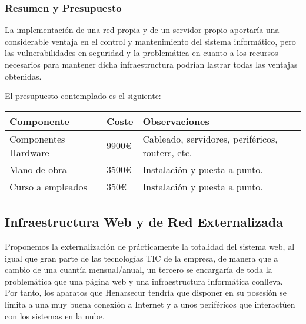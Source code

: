 \documentclass[12pt,letterpaper]{article}
\begin{document}
	\subsubsection{Resumen y Presupuesto}
	La implementación de una red propia y de un servidor propio aportaría una considerable ventaja en el control y mantenimiento del sistema informático, pero las vulnerabilidades en seguridad y la problemática en cuanto a los recursos necesarios para mantener dicha infraestructura podrían lastrar todas las ventajas obtenidas.\par
	El presupuesto contemplado es el siguiente:
	\begin{center}
    \begin{tabular}{ | l | l | p{7cm} |}
    \hline
    Componente & Coste & Observaciones \\ \hline
    Componentes Hardware & 9900€& Cableado, servidores, periféricos, routers, etc. \\ \hline
    Mano de obra & 3500€ & Instalación y puesta a punto. \\ \hline
    Curso a empleados & 350€ & Instalación y puesta a punto. \\ \hline
    \end{tabular}
	\end{center}
	
	\newpage
	
	
	\subsection{Infraestructura Web y de Red Externalizada}
	Proponemos la externalización de prácticamente la totalidad del sistema web, al igual que gran parte de las tecnologías TIC de la empresa, de manera que a cambio de una cuantía mensual/anual, un tercero se encargaría de toda la problemática que una página web y una infraestructura informática conlleva.\\
	Por tanto, los aparatos que Henarsecur tendría que disponer en su posesión se limita a una muy buena conexión a Internet y a unos periféricos que interactúen con los sistemas en la nube.
\end{document}
